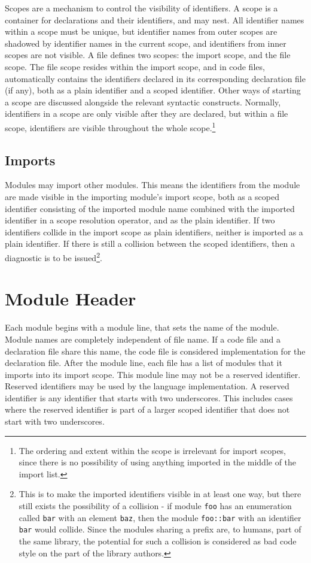 \documentclass[letterpaper,12pt]{book}
\begin{document}
Scopes are a mechanism to control the visibility of identifiers. A scope is a container for declarations and their identifiers, and may nest. All identifier names within a scope must be unique, but identifier names from outer scopes are shadowed by identifier names in the current scope, and identifiers from inner scopes are not visible. A file defines two scopes: the import scope, and the file scope. The file scope resides within the import scope, and in code files, automatically contains the identifiers declared in its corresponding declaration file (if any), both as a plain identifier and a scoped identifier. Other ways of starting a scope are discussed alongside the relevant syntactic constructs. Normally, identifiers in a scope are only visible after they are declared, but within a file scope, identifiers are visible throughout the whole scope.\footnote{The ordering and extent within the scope is irrelevant for import scopes, since there is no possibility of using anything imported in the middle of the import list.}

\subsection{Imports}

Modules may import other modules. This means the identifiers from the module are made visible in the importing module's import scope, both as a scoped identifier consisting of the imported module name combined with the imported identifier in a scope resolution operator, and as the plain identifier. If two identifiers collide in the import scope as plain identifiers, neither is imported as a plain identifier. If there is still a collision between the scoped identifiers, then a diagnostic is to be issued\footnote{This is to make the imported identifiers visible in at least one way, but there still exists the possibility of a collision - if module \texttt{foo} has an enumeration called \texttt{bar} with an element \texttt{baz}, then the module \texttt{foo::bar} with an identifier \texttt{bar} would collide. Since the modules sharing a prefix are, to humans, part of the same library, the potential for such a collision is considered as bad code style on the part of the library authors.}.

\section{Module Header}

Each module begins with a module line, that sets the name of the module. Module names are completely independent of file name. If a code file and a declaration file share this name, the code file is considered implementation for the declaration file. After the module line, each file has a list of modules that it imports into its import scope. This module line may not be a reserved identifier. Reserved identifiers may be used by the language implementation. A reserved identifier is any identifier that starts with two underscores. This includes cases where the reserved identifier is part of a larger scoped identifier that does not start with two underscores.
\end{document}
